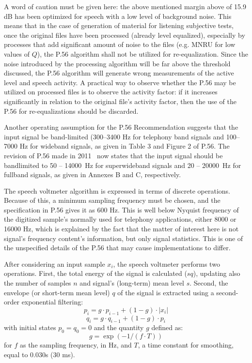 A word of caution must be given here: the above mentioned margin above
of 15.9 dB has been optimized for speech with a low level of
background noise. This means that in the case of generation of
material for listening subjective tests, once the original files have
been processed (already level equalized), especially by processes that
add significant amount of noise to the files (e.g. MNRU for low values
of $Q$), the P.56 algorithm shall not be utilized for re-equalization.
Since the noise introduced by the processing algorithm will be far
above the threshold discussed, the P.56 algorithm will generate wrong
measurements of the active level and speech activity. A practical way
to observe whether the P.56 may be utilized on processed files is to
observe the activity factor: if it increases significantly in relation
to the original file's activity factor, then the use of the P.56 for
re-equalizations should be discarded.

Another operating assumption for the P.56 Recommendation suggests that
the input signal be band-limited (300--3400 Hz for telephony band
signals and 100--7000 Hz for wideband signals, as given in Table 3 and
Figure 2 of P.56.
The revision of P.56 made in 2011~\cite{P.56-rev} now states that the input signal should be bandlimited to 50 -- 14000~Hz for superwideband signals and 20 -- 20000~Hz for fullband signals, as given in Annexes B and C, respectively.

The speech voltmeter algorithm is expressed in terms of discrete
operations. Because of this, a minimum sampling frequency must be
chosen, and the specification in P.56 gives it as 600 Hz. This is
well below Nyquist frequency of the digitized sample's normally used
for telephony applications, either 8000 or 16000 Hz, which is
explained by the fact that the matter of interest here is not
signal's frequency content's information, but only signal statistics.
This is one of the unspecified details of the P.56 that may cause
implementations to differ.

After considering an input sample $x_i$, the speech voltmeter performs
two operations. First, the total energy of the signal is calculated
($sq$), updating also the number of samples $n$ and signal's
(long-term) mean level $s$. Second, the envelope (or short-term mean
level) $q$ of the signal is extracted using a second-order exponential
filtering:
\[
p_i = g \cdot p_{i-1} + (1-g) \cdot | x_i | 
\]
\[
q_i = g \cdot q_{i-1} + (1-g) \cdot p_i
\]
with initial states $p_0=q_0=0$ and the quantity $g$ defined as:
\[
g = \exp(-1/(f \cdot T))
\]
for $f$ as the sampling frequency, in Hz, and $T$, a time constant for
smoothing, equal to 0.030s (30 ms).

